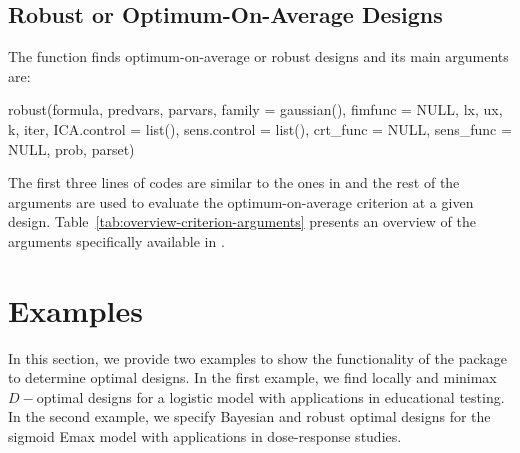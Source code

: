 \subsection{Robust or Optimum-On-Average Designs}\label{sec:optimum-on-average}
The   function finds optimum-on-average or robust designs and its main arguments are:
  \begin{example}
robust(formula, predvars, parvars, family = gaussian(), fimfunc = NULL,
       lx, ux, k, iter, ICA.control = list(), sens.control = list(),
       crt_func = NULL, sens_func = NULL,
       prob, parset)
\end{example}
The first three lines of codes are similar to the ones in  and the rest of the arguments are used  to evaluate the optimum-on-average criterion at a given design.  Table~\ref{tab:overview-criterion-arguments} presents an overview of the  arguments specifically available in .

\section{ Examples}
\label{sec:examples}
In this section, we provide two examples to show the functionality of the   package to determine optimal designs. In the first example, we find locally and minimax $D-$optimal designs for a logistic model with applications in educational testing. In the second example, we specify Bayesian and robust optimal designs for the sigmoid Emax model with applications in dose-response studies.
